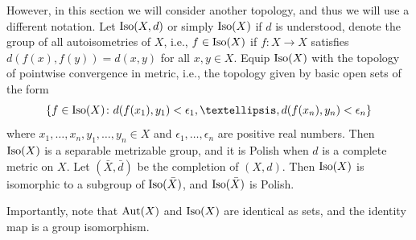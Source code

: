\documentclass{amsart}
\theoremstyle{definition}
\theoremstyle{remark}
\begin{document}
However, in this section we will consider another topology, and thus we will use a different notation. Let $\mbox{\rm Iso}(X,d)$ or simply $\mbox{\rm Iso}(X)$ if $d$ is understood, denote the group of all autoisometries of $X$, i.e., $f\in \mbox{\rm Iso}(X)$ if $f\colon X\to X$ satisfies $d(f(x), f(y))=d(x,y)$ for all $x,y\in X$. Equip $\mbox{\rm Iso}(X)$ with the topology of pointwise convergence in metric, i.e., the topology given by basic open sets of the form
$$ \{f\in \mbox{\rm Iso}(X)\colon d(f(x_1),y_1)<\epsilon_1, \dots, d(f(x_n),y_n)<\epsilon_n\} $$
where $x_1,\dots, x_n, y_1,\dots, y_n\in X$ and $\epsilon_1,\dots, \epsilon_n$ are positive real numbers. Then $\mbox{\rm Iso}(X)$ is a separable metrizable group, and it is Polish when $d$ is a complete metric on $X$. Let $(\bar{X},\bar{d})$ be the completion of $(X,d)$. Then $\mbox{\rm Iso}(X)$ is isomorphic to a subgroup of $\mbox{\rm Iso}(\bar{X})$, and $\mbox{\rm Iso}(\bar{X})$ is Polish. 

Importantly, note that $\mbox{\rm Aut}(X)$ and $\mbox{\rm Iso}(X)$ are identical as sets, and the identity map is a group isomorphism. 
\end{document}
